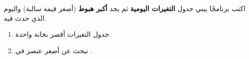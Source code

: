 \begin{statement}
اكتب برنامجًا يبني جدول \textbf{التغيرات اليومية}  ثم يجد \textbf{أكبر هبوط} (أصغر قيمة سالبة) واليوم الذي حدث فيه.
\end{statement}
\begin{stepsbox}\begin{enumerate}
\item جدول التغيرات أقصر بخانة واحدة.
\item نبحث عن أصغر عنصر في .
\end{enumerate}\end{stepsbox}
